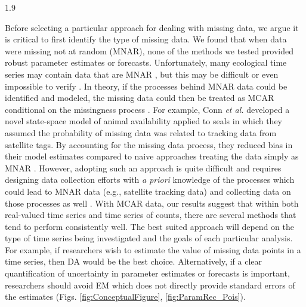 \documentclass[12pt,english]{article} %
\begin{document}
\begin{linenumbers}
\begin{spacing}{1.9}
\begin{flushleft}
\hspace{1em} Before selecting a particular approach for dealing with missing data, we argue it is critical to first identify the type of missing data. We found that when data were missing not at random (MNAR), none of the methods we tested provided robust parameter estimates or forecasts. Unfortunately, many ecological time series may contain data that are MNAR \citep{bowler2025treating, conn2012accounting}, but this may be difficult or even impossible to verify \citep{nakagawa_missing_2015}. In theory, if the processes behind MNAR data could be identified and modeled, the missing data could then be treated as MCAR conditional on the missingness process \citep{newman_missing_2014, nakagawa_missing_2015}. For example, Conn \textit{et al.} \citeyear{conn2012accounting} developed a novel state-space model of animal availability applied to seals in which they assumed the probability of missing data was related to tracking data from satellite tags. By accounting for the missing data process, they reduced bias in their model estimates compared to naive approaches treating the data simply as MNAR \cite{conn2012accounting}. However, adopting such an approach is quite difficult and requires designing data collection efforts with \textit{a priori} knowledge of the processes which could lead to MNAR data (e.g., satellite tracking data) and collecting data on those processes as well \cite{nakagawa_missing_2015}. With MCAR data, our results suggest that within both real-valued time series and time series of counts, there are several methods that tend to perform consistently well. The best suited approach will depend on the type of time series being investigated and the goals of each particular analysis. For example, if researchers wish to estimate the value of missing data points in a time series, then DA would be the best choice. Alternatively, if a clear quantification of uncertainty in parameter estimates or forecasts is important, researchers should avoid EM which does not directly provide standard errors of the estimates (Figs. \ref{fig:ConceptualFigure}, \ref{fig:ParamRec_Pois}). 


\end{flushleft}
\end{spacing}
\end{linenumbers}
\end{document}
